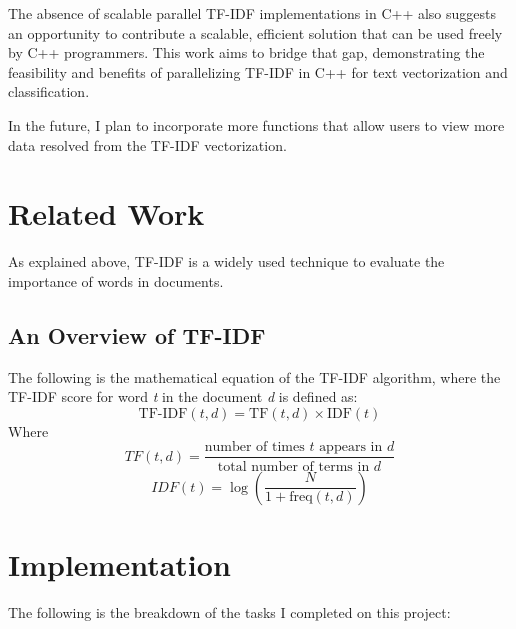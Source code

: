 \documentclass[conference]{IEEEtran}
\begin{document}
The absence of scalable parallel  TF-IDF implementations in C++ also suggests an opportunity to contribute a scalable, efficient solution that can be used freely by C++ programmers. This work aims to bridge that gap, demonstrating the feasibility and benefits of parallelizing TF-IDF in C++ for text vectorization and classification.

In the future, I plan to incorporate more functions that allow users to view more data resolved from the TF-IDF vectorization.

\section{Related Work}
As explained above, TF-IDF is a widely used technique to evaluate the importance of words in documents.

\subsection{An Overview of TF-IDF}
The following is the mathematical equation of the TF-IDF algorithm, where the TF-IDF score for word \textit{t} in the document \textit{d} is defined as:
\[
\text{TF-IDF}(t, d) = \text{TF}(t, d) \times \text{IDF}(t)
\]
Where
\[
TF(t,d) = \frac{\text{number of times } t \text{ appears in } d}{\text{total number of terms in } d}
\]
\[
IDF(t) = \log \left( \frac{N}{1 + \text{freq}(t,d)} \right)
\]

\section{Implementation} \label{sec:implementation}
The following is the breakdown of the tasks I completed on this project:
\end{document}
